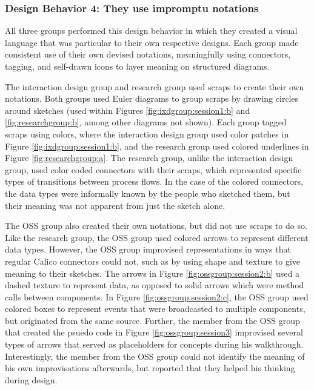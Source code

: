 \documentclass[12pt,fleqn]{ucithesis}
\begin{document}
\subsubsection{Design Behavior 4: They use impromptu notations}

All three groups performed this design behavior in which they created a visual language that was particular to their own respective designs. Each group made consistent use of their own devised notations, meaningfully using connectors, tagging, and self-drawn icons to layer meaning on structured diagrams.

The interaction design group and research group used scraps to create their own notations. Both groups used Euler diagrams to group scraps by drawing circles around sketches (used within Figures \ref{fig:ixdgroup:session1:b} and \ref{fig:researchgroup:b}, among other diagrams not shown). Each group tagged scraps using colors, where the interaction design group used color patches in Figure \ref{fig:ixdgroup:session1:b}, and the research group used colored underlines in Figure \ref{fig:researchgroup:a}. The research group, unlike the interaction design group, used color coded connectors with their scraps, which represented specific types of transitions between process flows. In the case of the colored connectors, the data types were informally known by the people who sketched them, but their meaning was not apparent from just the sketch alone. 

The OSS group also created their own notations, but did not use scraps to do so. Like the research group, the OSS group used colored arrows to represent different data types. However, the OSS group improvised representations in ways that regular Calico connectors could not, such as by using shape and texture to give meaning to their sketches. The arrows in Figure \ref{fig:ossgroup:session2:b} used a dashed texture to represent data, as opposed to solid arrows which were method calls between components. In Figure \ref{fig:ossgroup:session2:c}, the OSS group used colored boxes to represent events that were broadcasted to multiple components, but originated from the same source. Further, the member from the OSS group that created the psuedo code in Figure \ref{fig:ossgroup:session3} improvised several types of arrows that served as placeholders for concepts during his walkthrough. Interestingly, the member from the OSS group could not identify the meaning of his own improvisations afterwards, but reported that they helped his thinking during design.
\end{document}
